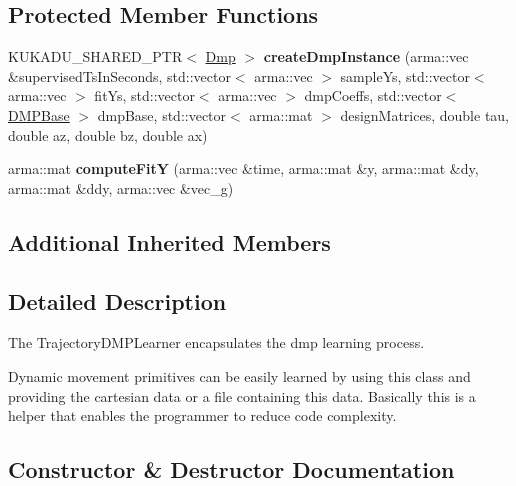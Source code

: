 \subsection*{Protected Member Functions}
\begin{DoxyCompactItemize}
\item 
K\+U\+K\+A\+D\+U\+\_\+\+S\+H\+A\+R\+E\+D\+\_\+\+P\+TR$<$ \hyperlink{classkukadu_1_1Dmp}{Dmp} $>$ {\bfseries create\+Dmp\+Instance} (arma\+::vec \&supervised\+Ts\+In\+Seconds, std\+::vector$<$ arma\+::vec $>$ sample\+Ys, std\+::vector$<$ arma\+::vec $>$ fit\+Ys, std\+::vector$<$ arma\+::vec $>$ dmp\+Coeffs, std\+::vector$<$ \hyperlink{classkukadu_1_1DMPBase}{D\+M\+P\+Base} $>$ dmp\+Base, std\+::vector$<$ arma\+::mat $>$ design\+Matrices, double tau, double az, double bz, double ax)\hypertarget{classkukadu_1_1CartesianDMPLearner_ac6060b23f8fbf519e3d9944dab73c8d2}{}\label{classkukadu_1_1CartesianDMPLearner_ac6060b23f8fbf519e3d9944dab73c8d2}

\item 
arma\+::mat {\bfseries compute\+FitY} (arma\+::vec \&time, arma\+::mat \&y, arma\+::mat \&dy, arma\+::mat \&ddy, arma\+::vec \&vec\+\_\+g)\hypertarget{classkukadu_1_1CartesianDMPLearner_a17b09095c1a7e462e34bf5448cb021ab}{}\label{classkukadu_1_1CartesianDMPLearner_a17b09095c1a7e462e34bf5448cb021ab}

\end{DoxyCompactItemize}
\subsection*{Additional Inherited Members}


\subsection{Detailed Description}
The Trajectory\+D\+M\+P\+Learner encapsulates the dmp learning process. 

Dynamic movement primitives can be easily learned by using this class and providing the cartesian data or a file containing this data. Basically this is a helper that enables the programmer to reduce code complexity. 

\subsection{Constructor \& Destructor Documentation}
